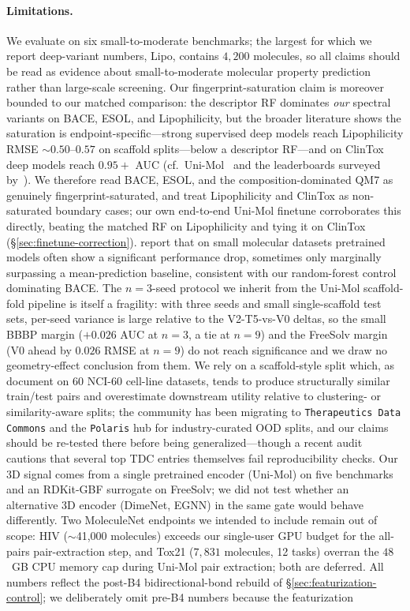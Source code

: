 \documentclass[sigconf,nonacm,anonymous,review]{acmart}
\begin{document}
\paragraph{Limitations.}
We evaluate on six small-to-moderate benchmarks; the largest for which we report deep-variant numbers, Lipo, contains $4{,}200$ molecules, so all claims should be read as evidence about small-to-moderate molecular property prediction rather than large-scale screening. Our fingerprint-saturation claim is moreover bounded to our matched comparison: the descriptor RF dominates \emph{our} spectral variants on BACE, ESOL, and Lipophilicity, but the broader literature shows the saturation is endpoint-specific---strong supervised deep models reach Lipophilicity RMSE $\sim$$0.50$--$0.57$ on scaffold splits---below a descriptor RF---and on ClinTox deep models reach $0.95{+}$ AUC (cf.\ Uni-Mol~\citep{zhou2023unimol} and the leaderboards surveyed by~\citet{deng2023systematic}). We therefore read BACE, ESOL, and the composition-dominated QM7 as genuinely fingerprint-saturated, and treat Lipophilicity and ClinTox as non-saturated boundary cases; our own end-to-end Uni-Mol finetune corroborates this directly, beating the matched RF on Lipophilicity and tying it on ClinTox (\S\ref{sec:finetune-correction}). \citet{wijaya2024twostage} report that on small molecular datasets pretrained models often show a significant performance drop, sometimes only marginally surpassing a mean-prediction baseline, consistent with our random-forest control dominating BACE. The $n{=}3$-seed protocol we inherit from the Uni-Mol scaffold-fold pipeline is itself a fragility: with three seeds and small single-scaffold test sets, per-seed variance is large relative to the V2-T5-vs-V0 deltas, so the small BBBP margin ($+0.026$ AUC at $n{=}3$, a tie at $n{=}9$) and the FreeSolv margin (V0 ahead by $0.026$ RMSE at $n{=}9$) do not reach significance and we draw no geometry-effect conclusion from them. We rely on a scaffold-style split which, as \citet{guo2024scaffold} document on 60 NCI-60 cell-line datasets, tends to produce structurally similar train/test pairs and overestimate downstream utility relative to clustering- or similarity-aware splits; the community has been migrating to \texttt{Therapeutics Data Commons} \citep{huang2021tdc} and the \texttt{Polaris} hub \citep{tossou2024polaris} for industry-curated OOD splits, and our claims should be re-tested there before being generalized---though a recent audit \citep{tdcaudit2026} cautions that several top TDC entries themselves fail reproducibility checks. Our 3D signal comes from a single pretrained encoder (Uni-Mol) on five benchmarks and an RDKit-GBF surrogate on FreeSolv; we did not test whether an alternative 3D encoder (DimeNet, EGNN) in the same gate would behave differently. Two MoleculeNet endpoints we intended to include remain out of scope: HIV ($\sim$41{,}000 molecules) exceeds our single-user GPU budget for the all-pairs pair-extraction step, and Tox21 ($7{,}831$ molecules, 12 tasks) overran the $48$~GB CPU memory cap during Uni-Mol pair extraction; both are deferred. All numbers reflect the post-B4 bidirectional-bond rebuild of \S\ref{sec:featurization-control}; we deliberately omit pre-B4 numbers because the featurization 
\end{document}

